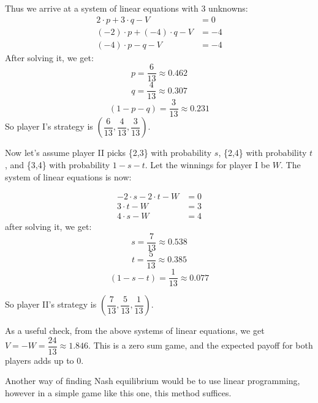 \documentclass[11pt,journal]{article}
\begin{document}
	Thus we arrive at a system of linear equations with 3 unknowns:
	\begin{align}
	2\cdot p + 3\cdot q - V&= 0 \\
	(-2)\cdot p+ (-4) \cdot q - V &= -4 \\
	(-4)\cdot p - q -V&= -4 
	\end{align}
	After solving it, we get:
	\[p=\dfrac{6}{13}\approx 0.462 \]
	\[q =\dfrac{4}{13}\approx 0.307 \]
	\[(1-p-q) = \dfrac{3}{13} \approx0.231 \]
	So player I's strategy is $(\dfrac{6}{13}, \dfrac{4}{13}, \dfrac{3}{13})$.
	
	Now let's assume player II picks \{2,3\} with probability $s$, \{2,4\} with probability $t$, and \{3,4\} with probability $1-s-t$. Let the winnings for player I be $W$. The system of linear equations is now:
	
	\begin{align}
	-2\cdot s -2 \cdot t -W & =0 \\
	3 \cdot t - W& = 3\\
	4\cdot s- W& = 4
	\end{align}
	after solving it, we get:
	\[s=\dfrac{7}{13}\approx 0.538 \]
	\[t =\dfrac{5}{13}\approx 0.385 \]
	\[(1-s-t) = \dfrac{1}{13} \approx0.077 \]
	
	So player II's strategy is $(\dfrac{7}{13}, \dfrac{5}{13}, \dfrac{1}{13})$.
	
	As a useful check, from the above systems of linear equations, we get $V = -W = \dfrac{24}{13} \approx 1.846$. This is a zero sum game, and the expected payoff for both players adds up to 0.
	
	Another way of finding Nash equilibrium would be to use linear programming, however in a simple game like this one, this method suffices.
	
	

	
\end{document}
